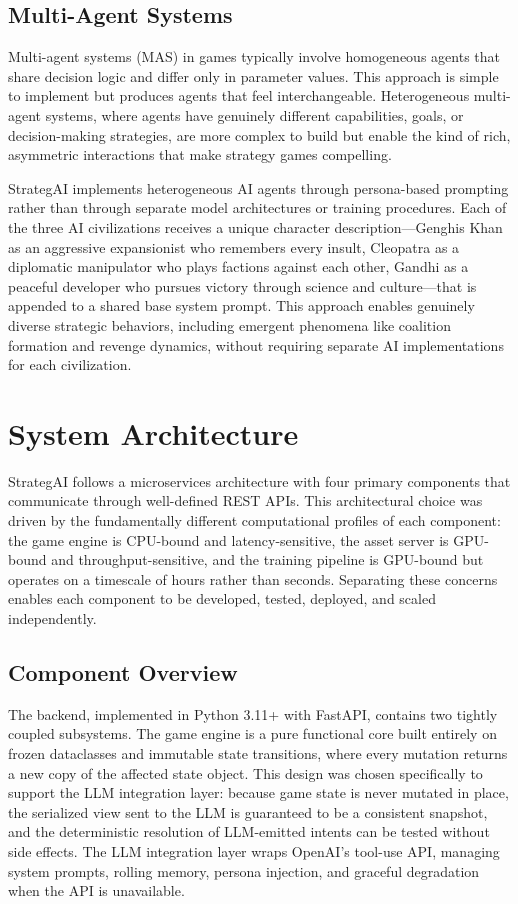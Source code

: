 \documentclass[conference]{IEEEtran}
\begin{document}
\subsection{Multi-Agent Systems}

Multi-agent systems (MAS) in games typically involve homogeneous agents that share decision logic and differ only in parameter values. This approach is simple to implement but produces agents that feel interchangeable. Heterogeneous multi-agent systems, where agents have genuinely different capabilities, goals, or decision-making strategies, are more complex to build but enable the kind of rich, asymmetric interactions that make strategy games compelling.

StrategAI implements heterogeneous AI agents through persona-based prompting rather than through separate model architectures or training procedures. Each of the three AI civilizations receives a unique character description---Genghis Khan as an aggressive expansionist who remembers every insult, Cleopatra as a diplomatic manipulator who plays factions against each other, Gandhi as a peaceful developer who pursues victory through science and culture---that is appended to a shared base system prompt. This approach enables genuinely diverse strategic behaviors, including emergent phenomena like coalition formation and revenge dynamics, without requiring separate AI implementations for each civilization.

\section{System Architecture}
\label{sec:architecture}

StrategAI follows a microservices architecture with four primary components that communicate through well-defined REST APIs. This architectural choice was driven by the fundamentally different computational profiles of each component: the game engine is CPU-bound and latency-sensitive, the asset server is GPU-bound and throughput-sensitive, and the training pipeline is GPU-bound but operates on a timescale of hours rather than seconds. Separating these concerns enables each component to be developed, tested, deployed, and scaled independently.

\subsection{Component Overview}

The backend, implemented in Python 3.11+ with FastAPI, contains two tightly coupled subsystems. The game engine is a pure functional core built entirely on frozen dataclasses and immutable state transitions, where every mutation returns a new copy of the affected state object. This design was chosen specifically to support the LLM integration layer: because game state is never mutated in place, the serialized view sent to the LLM is guaranteed to be a consistent snapshot, and the deterministic resolution of LLM-emitted intents can be tested without side effects. The LLM integration layer wraps OpenAI's tool-use API, managing system prompts, rolling memory, persona injection, and graceful degradation when the API is unavailable.
\end{document}
